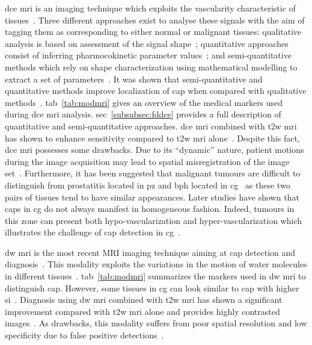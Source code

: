 \ac{dce} \ac{mri} is an imaging technique which exploits the vascularity characteristic of tissues~\cite{Verma2012}. %
Three different approaches exist to analyse these signals with the aim of tagging them as corresponding to either normal or malignant tissues: qualitative analysis is based on assessment of the signal shape~\cite{Hoeks2011}; quantitative approaches consist of inferring pharmocokinetic parameter values~\cite{Tofts2010}; and semi-quantitative methods which rely on shape characterization using mathematical modelling to extract a set of parameters~\cite{Hoeks2011,Verma2012}. It was shown that semi-quantitative and quantitative methods improve localization of \ac{cap} when compared with qualitative methods~\cite{Rosenkrantz2013}. \Acl{tab}~\ref{tab:modmri} gives an overview of the medical markers used during \ac{dce} \ac{mri} analysis. \Acl{sec}~\ref{subsubsec:fddce} provides a full description of quantitative and semi-quantitative approaches. \ac{dce} \ac{mri} combined with \ac{t2w} \ac{mri} has shown to enhance sensitivity compared to \ac{t2w} \ac{mri} alone~\cite{Jager1997,Kim2005,Schlemmer2004,Zelhof2009}. Despite this fact, \ac{dce} \ac{mri} possesses some drawbacks. Due to its ``dynamic'' nature, patient motions during the image acquisition may lead to spatial misregistration of the image set~\cite{Verma2012}. Furthermore, it has been suggested that malignant tumours are difficult to distinguish from prostatitis located in \ac{pz} and \ac{bph} located in \ac{cg}~\cite{Hoeks2011,Verma2012} as these two pairs of tissues tend to have similar appearances. Later studies have shown that \acp{cap} in \ac{cg} do not always manifest in homogeneous fashion. Indeed, tumours in this zone can present both hypo-vascularization and hyper-vascularization which illustrates the challenge of \ac{cap} detection in \ac{cg}~\cite{Niekerk2013}.

\ac{dw} \ac{mri} is the most recent MRI imaging technique aiming at \ac{cap} detection and diagnosis~\cite{Scheidler1999}. This modality exploits the variations in the motion of water molecules in different tissues~\cite{LeBihan1988,Koh2007}. \Acl{tab}~\ref{tab:modmri} summarizes the markers used in \ac{dw} \ac{mri} to distinguish \ac{cap}. However, some tissues in \ac{cg} can look similar to \ac{cap} with higher \ac{si}~\cite{Barentsz2012}. Diagnosis using \ac{dw} \ac{mri} combined with \ac{t2w} \ac{mri} has shown a significant improvement compared with \ac{t2w} \ac{mri} alone and provides highly contrasted images~\cite{Shimofusa2005,Padhani2011,Choi2007}. As drawbacks, this modality suffers from poor spatial resolution and low specificity due to false positive detections~\cite{Choi2007}.

